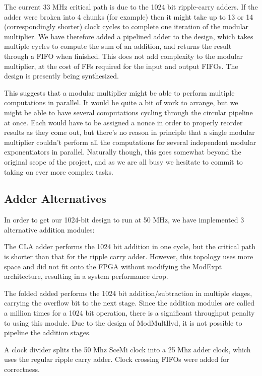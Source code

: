 \documentclass[12pt]{article}
\begin{document}
The current 33 MHz critical path is due to the 1024 bit ripple-carry adders. If the adder were broken 
into 4 chunks (for example) then it might take up to 13 or 14 (correspondingly shorter) clock cycles to complete 
one iteration of the modular multiplier. We have therefore added a pipelined adder to the design, which takes multiple
cycles to compute the sum of an addition, and returns the result through a FIFO when finished. This does not
add complexity to the modular multiplier, at the cost of FFs required for the input and output FIFOs. The
design is presently being synthesized. 

This suggests that a modular multiplier might be able to perform multiple computations in parallel.
It would be quite a bit of work to arrange,
but we might be able to have several computations cycling through the circular pipeline at once.
Each would have to be assigned a nonce in order to properly reorder results as they come out,
but there's no reason in principle that a single modular multiplier couldn't perform all the computations
for several independent modular exponentiators in parallel.
Naturally though, this goes somewhat beyond the original scope of the project,
and as we are all busy we hesitate to commit to taking on ever more complex tasks.
\subsection{Adder Alternatives}
In order to get our 1024-bit design to run at 50 MHz, we have implemented 3 alternative addition modules:

The CLA adder performs the 1024 bit addition in one cycle, but the critical path
is shorter than that for the ripple carry adder. However, this topology uses more
space and did not fit onto the FPGA without modifying the ModExpt architecture, resulting
in a system performance drop.

The folded added performs the 1024 bit addition/subtraction in multiple stages, carrying
the overflow bit to the next stage. Since the addition modules are called a million times for a
1024 bit operation, there is a significant throughput penalty to using this module. Due to 
the design of ModMultIlvd, it is not possible to pipeline the addition stages.

A clock divider splits the 50 Mhz SceMi clock into a 25 Mhz adder clock, which uses
the regular ripple carry adder. Clock crossing FIFOs were added for correctness.
\end{document}
